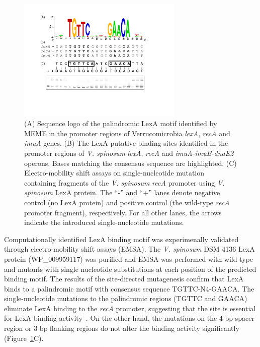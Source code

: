 \begin{figure}
  \centering
  \includegraphics[width=0.7\textwidth]{figures/chapter5/verruco_lexa}
  \caption{(A) Sequence logo of the palindromic LexA motif identified by MEME
    in the promoter regions of Verrucomicrobia \textit{lexA}, \textit{recA} and
    \textit{imuA} genes. (B) The LexA putative binding sites identified in the
    promoter regions of \textit{V. spinosum} \textit{lexA}, \textit{recA} and
    \textit{imuA-imuB-dnaE2} operons. Bases matching the consensus sequence are
    highlighted. (C) Electro-mobility shift assays on single-nucleotide
    mutation containing fragments of the \textit{V. spinosum} \textit{recA}
    promoter using \textit{V. spinosum} LexA protein. The ``-'' and ``+'' lanes
    denote negative control (no LexA protein) and positive control (the
    wild-type \textit{recA} promoter fragment), respectively. For all other
    lanes, the arrows indicate the introduced single-nucleotide mutations.}
  \label{fig:verruco-lexa}
\end{figure}

Computationally identified LexA binding motif was experimenally validated
through electro-mobility shift assays (EMSA). The \textit{V. spinosum} DSM 4136
LexA protein (WP\_009959117) was purified and EMSA was performed with wild-type
and mutants with single nucleotide substitutions at each position of the
predicted binding motif. The results of the site-directed mutagenesis confirm
that LexA binds to a palindromic motif with consensus sequence
TGTTC-N4-GAACA\@. The single-nucleotide mutations to the palindromic regions
(TGTTC and GAACA) eliminate LexA binding to the \textit{recA} promoter,
suggesting that the site is essential for LexA binding
activity~\cite{groban2005binding}. On the other hand, the mutations on the 4 bp
spacer region or 3 bp flanking regions do not alter the binding activity
significantly (Figure~\ref{fig:verruco-lexa}C).

